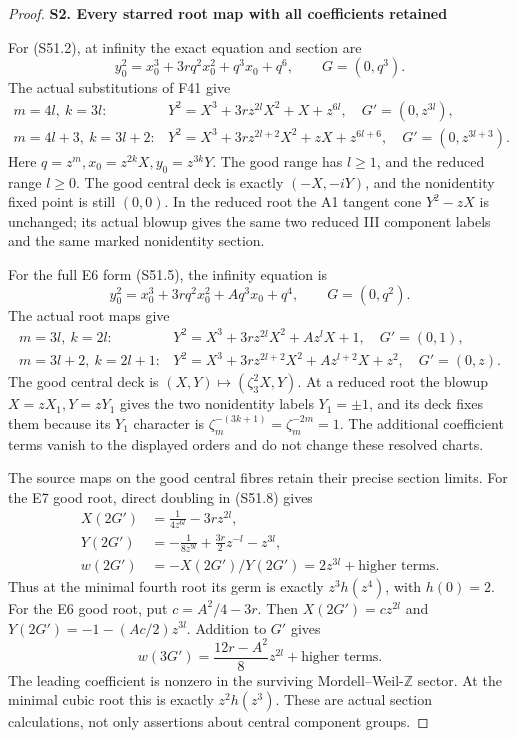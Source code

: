 \begin{proof}
\par

\medskip\noindent\textbf{S2. Every starred root map with all coefficients retained}

\par\nobreak

For (S51.2), at infinity the exact equation and section are
\[
 y_0^2=x_0^3+3r q^2x_0^2+q^3x_0+q^6,\qquad
                         G=(0,q^3).
\]
The actual substitutions of F41 give
\[
 \begin{array}{ll}
 m=4l,\ k=3l:
 &Y^2=X^3+3r z^{2l}X^2+X+z^{6l},
       \quad G'=(0,z^{3l}),\\
 m=4l+3,\ k=3l+2:
 &Y^2=X^3+3r z^{2l+2}X^2+zX+z^{6l+6},
       \quad G'=(0,z^{3l+3}).
 \end{array}
 \tag{S51.8}
\]
Here \(q=z^m,x_0=z^{2k}X,y_0=z^{3k}Y\).
The good range has \(l\ge1\), and the reduced range \(l\ge0\).
The good central deck is exactly \((-X,-iY)\), and the
nonidentity fixed point is still \((0,0)\). In the reduced
root the A1 tangent cone \(Y^2-zX\) is unchanged; its actual
blowup gives the same two reduced III component labels and
the same marked nonidentity section.

For the full E6 form (S51.5), the infinity equation is
\[
 y_0^2=x_0^3+3r q^2x_0^2+Aq^3x_0+q^4,\qquad G=(0,q^2).
\]
The actual root maps give
\[
 \begin{array}{ll}
 m=3l,\ k=2l:
 &Y^2=X^3+3r z^{2l}X^2+A z^lX+1,\quad G'=(0,1),\\
 m=3l+2,\ k=2l+1:
 &Y^2=X^3+3r z^{2l+2}X^2+A z^{l+2}X+z^2,
       \quad G'=(0,z).
 \end{array}
 \tag{S51.9}
\]
The good central deck is \((X,Y)\mapsto(\zeta_3^2X,Y)\).
At a reduced root the blowup \(X=zX_1,Y=zY_1\) gives
the two nonidentity labels \(Y_1=\pm1\), and its deck
fixes them because its \(Y_1\) character is
\(\zeta_m^{-(3k+1)}=\zeta_m^{-2m}=1\).
The additional coefficient terms vanish to the displayed
orders and do not change these resolved charts.

The source maps on the good central fibres retain their
precise section limits. For the E7 good root, direct doubling
in (S51.8) gives
\[
 \begin{split}
 X(2G')&=\frac1{4z^{6l}}-3r z^{2l},\\
 Y(2G')&=-\frac1{8z^{9l}}+\frac{3r}{2}z^{-l}-z^{3l},\\
 w(2G')&=-X(2G')/Y(2G')
                  =2z^{3l}+\text{higher terms}.
 \end{split}
 \tag{S51.10}
\]
Thus at the minimal fourth root its germ is exactly
\(z^3 h(z^4)\), with \(h(0)=2\).
For the E6 good root, put \(c=A^2/4-3r\).
Then \(X(2G')=c z^{2l}\) and
\(Y(2G')=-1-(Ac/2)z^{3l}\). Addition to \(G'\) gives
\[
 w(3G')=\frac{12r-A^2}{8}z^{2l}
                         +\text{higher terms}.
 \tag{S51.11}
\]
The leading coefficient is nonzero in the surviving
Mordell--Weil-\(\mathbb Z\) sector. At the minimal cubic
root this is exactly \(z^2 h(z^3)\).
These are actual section calculations, not only assertions
about central component groups.


\end{proof}
